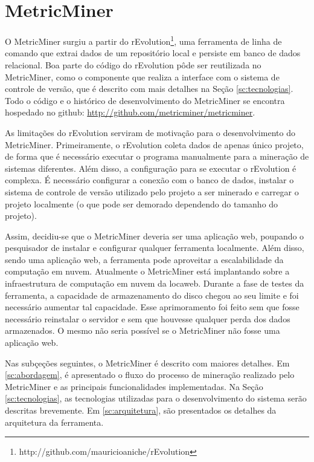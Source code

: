 \documentclass[a4paper, 12pt, twoside]{book}
\begin{document}
    
\chapter{MetricMiner} \label{ch:arquitetura}

    O MetricMiner surgiu a partir do rEvolution\footnote{http://github.com/mauricioaniche/rEvolution}, uma ferramenta de linha de comando que extrai dados de um repositório local e persiste em banco de dados  relacional. Boa parte do código do rEvolution pôde ser reutilizada no MetricMiner, como o componente que realiza a interface com o sistema de controle de versão, que é descrito com mais detalhes na Seção \ref{sc:tecnologias}. Todo o código e o histórico de desenvolvimento do MetricMiner se encontra hospedado no github: \url{http://github.com/metricminer/metricminer}.

    As limitações do rEvolution serviram de motivação para o desenvolvimento do MetricMiner. Primeiramente, o rEvolution coleta dados de apenas único projeto, de forma que é necessário executar o programa manualmente para a mineração de sistemas diferentes. Além disso, a configuração para se executar o rEvolution é complexa. É necessário configurar a conexão com o banco de dados, instalar o sistema de controle de versão utilizado pelo projeto a ser minerado e carregar o projeto localmente (o que pode ser demorado dependendo do tamanho do projeto). 

    Assim, decidiu-se que o MetricMiner deveria ser uma aplicação web, poupando o pesquisador de instalar e configurar qualquer ferramenta localmente. Além disso, sendo uma aplicação web, a ferramenta pode aproveitar a escalabilidade da computação em nuvem. Atualmente o MetricMiner está implantando sobre a infraestrutura de computação em nuvem da locaweb. Durante a fase de testes da ferramenta, a capacidade de armazenamento do disco chegou ao seu limite e foi necessário aumentar tal capacidade. Esse aprimoramento foi feito sem que fosse necessário reinstalar o servidor e sem que houvesse qualquer perda dos dados armazenados. O mesmo não seria possível se o MetricMiner não fosse uma aplicação web.

    Nas subçeções seguintes, o MetricMiner é descrito com maiores detalhes. Em \ref{sc:abordagem}, é apresentado o fluxo do processo de mineração realizado pelo MetricMiner e as principais funcionalidades implementadas. Na Seção \ref{sc:tecnologias}, as tecnologias utilizadas para o desenvolvimento do sistema serão descritas brevemente. Em \ref{sc:arquitetura}, são presentados os detalhes da arquitetura da ferramenta.
\end{document}
